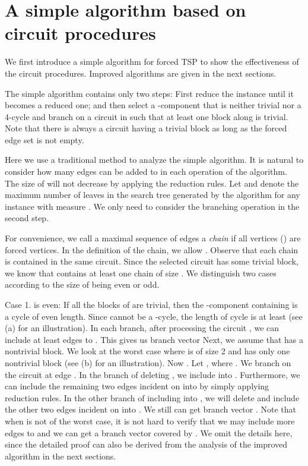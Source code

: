\documentclass[runningheads]{llncs}
\begin{document}
\section{A simple algorithm based on circuit procedures}\label{simple_alg}
We first introduce a simple algorithm for forced TSP to show the effectiveness of the circuit procedures. Improved algorithms are given in the next sections.

The simple algorithm contains only two steps: First reduce the instance until it becomes a reduced one;
and then select a -component  that is neither trivial nor a 4-cycle and branch on a circuit  in  such that at least one block along  is trivial.
Note that there is always a circuit having a trivial block as long as the forced edge set  is not empty.

Here we use a traditional method to analyze the simple algorithm. It is natural to consider how many edges can be added to  in each operation of the algorithm. The size of  will not decrease by applying the reduction rules. Let  and  denote the maximum number of leaves in the search tree generated by the algorithm for any instance with measure .
We only need to consider the branching operation in the second step.

For convenience, we call a maximal sequence  of edges    a {\em chain} if all vertices  () are forced vertices. In the definition of the chain, we allow .
Observe that each chain is contained in the same circuit.
Since the selected circuit  has some trivial block, we know that  contains at least one chain  of size .
We distinguish two cases according to the size of  being even or odd.

Case 1.  is even: If all the blocks of  are trivial, then the -component  containing  is a cycle  of even length. Since  cannot be a -cycle, the length of cycle  is at least  (see (a) for an illustration).
In each branch, after processing the circuit , we can include at least  edges to . This gives us branch vector
Next, we assume that   has a nontrivial block. We look at the worst case where  is of size 2 and
  has only one nontrivial block (see (b) for an illustration). Now .
 Let , where .
We branch on the circuit at edge .
In the branch of deleting , we include  into  .
Furthermore, we can include the remaining two edges incident on  into  by
 simply applying reduction rules. In the other branch of including  into , we will delete  and include
 the other two edges incident on  into . We still can get branch vector .
Note that when  is not of the worst case, it is not hard to verify that we may include more edges to  and we can get a branch vector covered by . We omit the details here, since the detailed proof can also be derived from the analysis of the improved algorithm in the next sections.
\vspace{-0mm}\vspace{-0mm}
\end{document}
